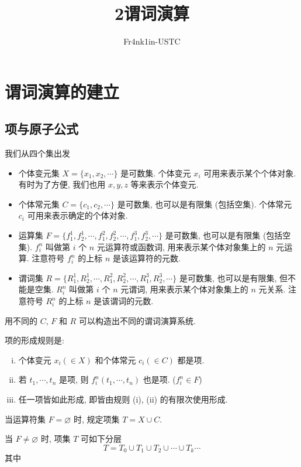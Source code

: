 \documentclass[
    mode=hazy,
    color=blue,
    device=normal,
    lang=cn
]{elegantnote}
\title{2\hspace{.5cm}谓词演算}
\author{Fr4nk1in-USTC}
\institute{中国科学技术大学计算机学院}
\date{\zhtoday}
\begin{document}
\setlength\abovedisplayskip{.125em}
\setlength\belowdisplayskip{.125em}
\maketitle
\section{谓词演算的建立}
\subsection{项与原子公式}
我们从四个集出发
\begin{itemize}[listparindent = 2em]
    \item 个体变元集 $X=\{x_1, x_2, \cdots\}$ 是可数集. 个体变元 $x_i$ 可用来表示某个个体对象. 有时为了方便, 我们也用 $x, y, z$ 等来表示个体变元.
    \item 个体常元集 $C=\{c_1, c_2, \cdots\}$ 是可数集, 也可以是有限集 (包括空集). 个体常元 $c_i$ 可用来表示确定的个体对象.
    \item 运算集 $F=\{f_1^1, f_2^1, \cdots, f_1^2, f_2^2, \cdots, f_1^3, f_2^3, \cdots\}$ 是可数集, 也可以是有限集 (包括空集).
          $f_i^n$ 叫做第 $i$ 个 $n$ 元运算符或函数词, 用来表示某个体对象集上的 $n$ 元运算. 注意符号 $f_i^n$ 的上标 $n$ 是该运算符的元数.
    \item 谓词集 $R=\{R_1^1, R_2^1, \cdots, R_1^2, R_2^2, \cdots, R_1^3, R_2^3, \cdots\}$ 是可数集, 也可以是有限集, 但不能是空集.
          $R_i^n$ 叫做第 $i$ 个 $n$ 元谓词, 用来表示某个体对象集上的 $n$ 元关系. 注意符号 $R_i^n$ 的上标 $n$ 是该谓词的元数.
\end{itemize}
用不同的 $C$, $F$ 和 $R$ 可以构造出不同的谓词演算系统.
\begin{definition}[项集 $T$]
    项的形成规则是:
    \begin{enumerate}[(i)]
        \item 个体变元 $x_i (\in X)$ 和个体常元 $c_i (\in C)$ 都是项.
        \item 若 $t_1, \cdots, t_n$ 是项, 则 $f_i^n(t_1, \cdots, t_n)$ 也是项. ($f_i^n\in F$)
        \item 任一项皆如此形成, 即皆由规则 (i), (ii) 的有限次使用形成.
    \end{enumerate}
    当运算符集 $F=\varnothing$ 时, 规定项集 $T=X\cup C$.
\end{definition}
当 $F\neq \varnothing$ 时, 项集 $T$ 可如下分层
$$
    T=T_0\cup T_1\cup T_2\cup \cdots\cup T_k\cdots
$$
其中
\end{document}
